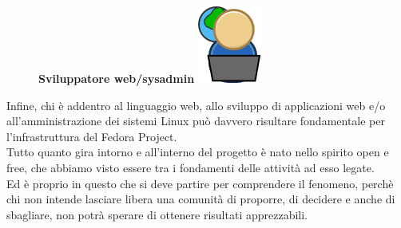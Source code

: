 \begin{figure}[!h]
\centering
{\bfseries Sviluppatore web/sysadmin \includegraphics[scale=.30]{articoli/varie/immagini/join-webdevel.png}}
\end{figure}
Infine, chi è addentro al linguaggio web, allo sviluppo di applicazioni web e/o all'amministrazione dei sistemi Linux può davvero risultare fondamentale per l'infrastruttura del Fedora Project.\\

Tutto quanto gira intorno e all'interno del progetto è nato nello spirito open e free, che abbiamo visto essere tra i fondamenti delle attività ad esso legate.\\

Ed è proprio in questo che si deve partire per comprendere il fenomeno, perchè chi non intende lasciare libera una comunità di proporre, di decidere e anche di sbagliare, non potrà sperare di ottenere risultati apprezzabili.\\
